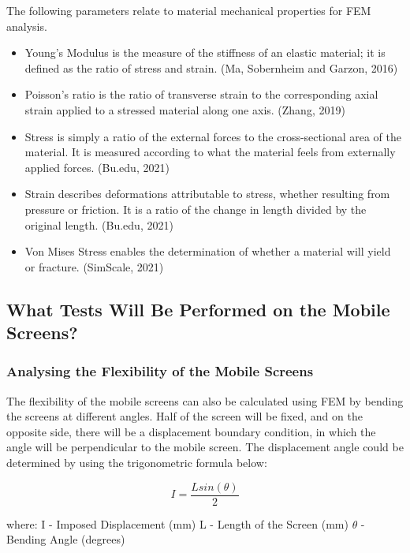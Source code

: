 \documentclass[a4paper,12pt]{article}
\numberwithin{equation}{section}
\numberwithin{figure}{section}
\begin{document}
\noindent The following parameters relate to material mechanical properties for FEM analysis. 

\begin{itemize}
\item Young’s Modulus is the measure of the stiffness of an elastic material; it is defined as the ratio of stress and strain. (Ma, Sobernheim and Garzon, 2016)
\item Poisson’s ratio is the ratio of transverse strain to the corresponding axial strain applied to a stressed material along one axis. (Zhang, 2019)
\item Stress is simply a ratio of the external forces to the cross-sectional area of the material. It is measured according to what the material feels from externally applied forces. (Bu.edu, 2021)
\item Strain describes deformations attributable to stress, whether resulting from pressure or friction. It is a ratio of the change in length divided by the original length. (Bu.edu, 2021)
\item Von Mises Stress enables the determination of whether a material will yield or fracture. (SimScale, 2021)
\end{itemize}

\subsection{What Tests Will Be Performed on the Mobile Screens?}

\subsubsection{Analysing the Flexibility of the Mobile Screens}

\noindent The flexibility of the mobile screens can also be calculated using FEM by bending the screens at different angles. Half of the screen will be fixed, and on the opposite side, there will be a displacement boundary condition, in which the angle will be perpendicular to the mobile screen. The displacement angle could be determined by using the trigonometric formula below:

\begin{equation}
I = \frac{L sin(\theta)}{2}
\end{equation}

\noindent where:\newline
I - Imposed Displacement (mm)\newline
L - Length of the Screen (mm)\newline
$\theta$ - Bending Angle (degrees)
\end{document}
